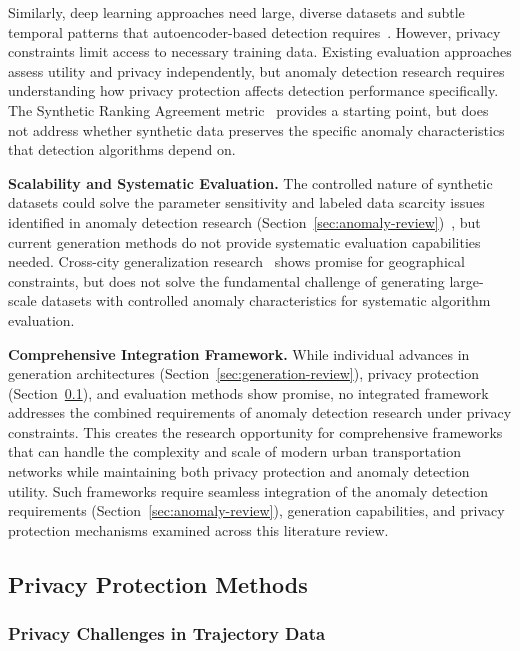 \documentclass[runningheads]{llncs}
\begin{document}
Similarly, deep learning approaches need large, diverse datasets and subtle temporal patterns that autoencoder-based detection requires~\cite{huangLSTMAutoencodersAttention2021}. However, privacy constraints limit access to necessary training data. Existing evaluation approaches assess utility and privacy independently, but anomaly detection research requires understanding how privacy protection affects detection performance specifically. The Synthetic Ranking Agreement metric~\cite{jordonPATEGANGeneratingSynthetic2019} provides a starting point, but does not address whether synthetic data preserves the specific anomaly characteristics that detection algorithms depend on.

\textbf{Scalability and Systematic Evaluation.} The controlled nature of synthetic datasets could solve the parameter sensitivity and labeled data scarcity issues identified in anomaly detection research (Section~\ref{sec:anomaly-review})~\cite{zhangIBATDetectingAnomalous2011}, but current generation methods do not provide systematic evaluation capabilities needed. Cross-city generalization research~\cite{wangGTGGeneralizableTrajectory2025} shows promise for geographical constraints, but does not solve the fundamental challenge of generating large-scale datasets with controlled anomaly characteristics for systematic algorithm evaluation.

\textbf{Comprehensive Integration Framework.} While individual advances in generation architectures (Section~\ref{sec:generation-review}), privacy protection (Section~\ref{sec:privacy-review}), and evaluation methods show promise, no integrated framework addresses the combined requirements of anomaly detection research under privacy constraints. This creates the research opportunity for comprehensive frameworks that can handle the complexity and scale of modern urban transportation networks while maintaining both privacy protection and anomaly detection utility. Such frameworks require seamless integration of the anomaly detection requirements (Section~\ref{sec:anomaly-review}), generation capabilities, and privacy protection mechanisms examined across this literature review.

\subsection{Privacy Protection Methods}
\label{sec:privacy-review}

\subsubsection{Privacy Challenges in Trajectory Data}
\end{document}
